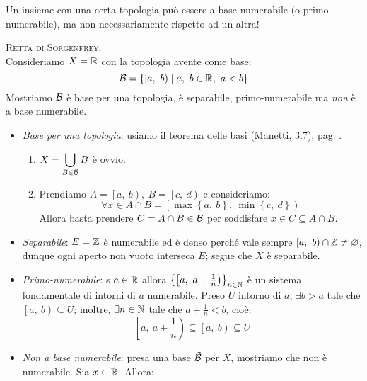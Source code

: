 \begin{attention}
Un insieme con una certa topologia può essere a base numerabile (o primo-numerabile), ma non necessariamente rispetto ad un altra!
\end{attention}
\begin{example}
\textsc{Retta di Sorgenfrey}.\\
Consideriamo $X=\mathbb{R}$ con la topologia avente come base:
\begin{equation}
\basis=\left\{\left[a,\ b\right)\mid a,\ b\in\realset,\ a<b\right\}
\end{equation}
Mostriamo $\mathcal{B}$ è base per una topologia, è separabile, primo-numerabile ma \textit{non} è a base numerabile.
\begin{itemize}
	\item \textit{Base per una topologia}: usiamo il teorema delle basi (Manetti, 3.7), pag. \pageref{teoremabasi}.
	\begin{enumerate}[label=\Roman*]
		\item $\displaystyle X=\mathop{{\bigcup}}\displaylimits_{B\in \mathcal{B}}B$ è ovvio.
		\item Prendiamo $A=\left[a,\ b\right),\ B=\left[c,\ d\right)$ e consideriamo:
		\begin{equation*}
			\forall x\in A\cap B=\left[\max\left\{a,\ b\right\},\ \min\left\{c,\ d\right\}\right)
		\end{equation*}
	Allora basta prendere $C=A\cap B\in\mathcal{B}$ per soddisfare $x\in C\subseteq A\cap B$.
	\end{enumerate}
\item \textit{Separabile}: $E=\mathbb{Z}$ è numerabile ed è denso perché vale sempre $\left[a,\ b\right)\cap \mathbb{Z} \neq \varnothing$, dunque ogni aperto non vuoto interseca $E$; segue che $X$ è separabile.
\item \textit{Primo-numerabile}: s $a\in\mathbb{R}$ allora $\left\{\left[a,\ a+\frac{1}{n}\right)\right\}_{n\in\naturalset}$ è un sistema fondamentale di intorni di $a$ numerabile. Preso $U$ intorno di $a$, $\exists b>a$ tale che $\left[a,\ b\right)\subseteq U$; inoltre, $\exists n\in\mathbb{N}$ tale che $a+\frac{1}{n}<b$, cioè:
\begin{equation*}
\left[a,\ a+\frac{1}{n}\right)\subseteq\left[a,\ b\right)\subseteq U
\end{equation*}
\item \textit{Non a base numerabile}: presa una base $\tilde{\mathcal{B}}$ per $X$, mostriamo che non è numerabile. Sia $x\in\mathbb{R}$. Allora:
\begin{equation*}

\end{equation*}
\end{itemize}
\end{example}
